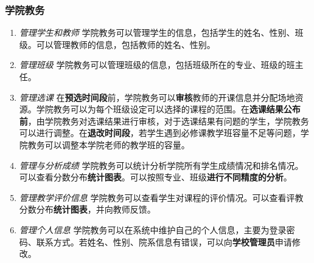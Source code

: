 \subsubsection{学院教务}
\begin{enumerate}
    \item \textit{管理学生和教师} \quad 学院教务可以管理学生的信息，包括学生的姓名、性别、班级。可以管理教师的信息，包括教师的姓名、性别。
    \item \textit{管理班级} \quad 学院教务可以管理班级的信息，包括班级所在的专业、班级的班主任。
    \item \textit{管理选课} \quad 在\textbf{预选时间段}前，学院教务可以\textbf{审核}教师的开课信息并分配场地资源。学院教务可以为每个班级设定可以选择的课程的范围。在\textbf{选课结果公布前}，由学院教务对选课结果进行审核，对于选课结果有问题的学生，学院教务可以进行调整。在\textbf{退改时间段}，若学生遇到必修课教学班容量不足等问题，学院教务可以调整本学院老师的教学班的容量。
    \item \textit{管理与分析成绩} \quad 学院教务可以统计分析学院所有学生成绩情况和排名情况。可以查看分数分布\textbf{统计图表}。可以按照专业、班级\textbf{进行不同精度的分析}。
    \item \textit{管理教学评价信息} \quad 学院教务可以查看学生对课程的评价情况。可以查看评教分数分布\textbf{统计图表}，并向教师反馈。
    \item \textit{管理个人信息} \quad 学院教务可以在系统中维护自己的个人信息，主要为登录密码、联系方式。若姓名、性别、院系信息有错误，可以向\textbf{学校管理员}申请修改。
\end{enumerate}

